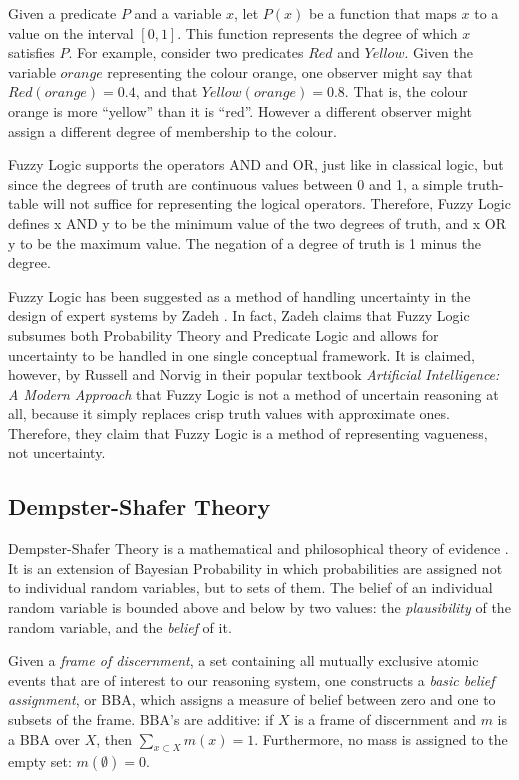 \documentclass[thesis.tex]{subfiles}
\begin{document}
Given a predicate $P$ and a variable $x$, let $P(x)$ be a function that maps
$x$ to a value on the interval $[0, 1]$. This function represents the degree of which
$x$ satisfies $P$. For example, consider two predicates $Red$ and $Yellow$. Given
the variable $orange$ representing the colour orange, one observer might say that
$Red(orange) = 0.4$, and that $Yellow(orange) = 0.8$. That is, the colour orange
is more ``yellow'' than it is ``red''. However a different observer might assign
a different degree of membership to the colour.

Fuzzy Logic supports the operators AND and OR, just like in classical logic, but since
the degrees of truth are continuous values between 0 and 1, a simple truth-table will
not suffice for representing the logical operators. Therefore, Fuzzy Logic defines
x AND y to be the minimum value of the two degrees of truth, and x OR y to be the
maximum value. The negation of a degree of truth is 1 minus the degree.

Fuzzy Logic has been suggested as a method of handling uncertainty in the design
of expert systems by Zadeh \cite{zadeh1983role}. In fact, Zadeh claims that
Fuzzy Logic subsumes both Probability Theory and Predicate Logic and allows for
uncertainty to be handled in one single conceptual framework. It is claimed, however,
by Russell and Norvig in their popular textbook \emph{Artificial Intelligence: A Modern Approach}
\cite{russell2003} that Fuzzy Logic is not a method of uncertain reasoning at all,
because it simply replaces crisp truth values with approximate ones. Therefore, they
claim that Fuzzy Logic is a method of representing vagueness, not uncertainty.



\subsection{Dempster-Shafer Theory}
\label{sec:dst}

Dempster-Shafer Theory is a mathematical and philosophical theory of evidence
\cite{shafer1976mathematical}. It is an extension of Bayesian Probability in which
probabilities are assigned not to individual random variables, but to sets of them.
The belief of an individual random variable is bounded above and below by two values:
the \emph{plausibility} of the random variable, and the \emph{belief} of it.

Given a \emph{frame of discernment}, a set containing all mutually exclusive atomic
events that are of interest to our reasoning system, one constructs a \emph{basic belief assignment},
or BBA, which assigns a measure of belief between zero and one to subsets of the frame. BBA's are additive: if
$X$ is a frame of discernment and $m$ is a BBA over $X$, then $\sum_{x \subset X} m(x) = 1$.
Furthermore, no mass is assigned to the empty set: $m(\emptyset) = 0$.
\end{document}
